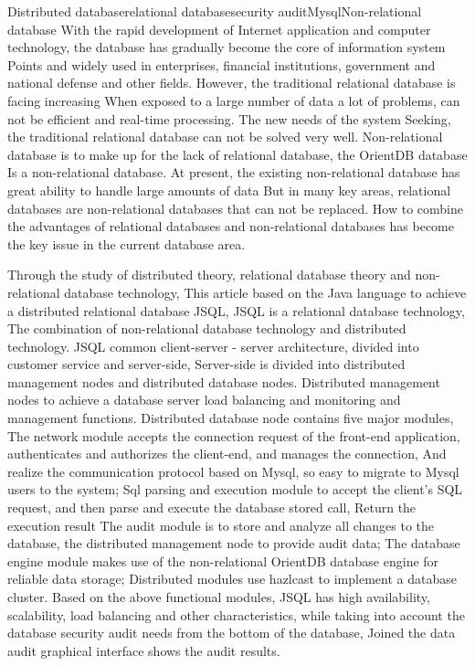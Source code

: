 
\begin{Eabstract}{Distributed database}{relational database}{security audit}{Mysql}{Non-relational database}
With the rapid development of Internet application and computer technology, the database has gradually become the core of information system
Points and widely used in enterprises, financial institutions, government and national defense and other fields.
However, the traditional relational database is facing increasing
When exposed to a large number of data a lot of problems, can not be efficient and real-time processing. The new needs of the system
Seeking, the traditional relational database can not be solved very well.
Non-relational database is to make up for the lack of relational database, the OrientDB database
Is a non-relational database. At present, the existing non-relational database has great ability to handle large amounts of data
But in many key areas, relational databases are non-relational databases that can not be replaced.
How to combine the advantages of relational databases and non-relational databases has become the key issue in the current database area.

Through the study of distributed theory, relational database theory and non-relational database technology,
This article based on the Java language to achieve a distributed relational database JSQL, JSQL is a relational database technology,
The combination of non-relational database technology and distributed technology. JSQL common client-server - server architecture, divided into customer service and server-side,
Server-side is divided into distributed management nodes and distributed database nodes.
Distributed management nodes to achieve a database server load balancing and monitoring and management functions. Distributed database node contains five major modules,
The network module accepts the connection request of the front-end application, authenticates and authorizes the client-end, and manages the connection,
And realize the communication protocol based on Mysql, so easy to migrate to Mysql users to the system;
Sql parsing and execution module to accept the client's SQL request, and then parse and execute the database stored call,
Return the execution result
The audit module is to store and analyze all changes to the database, the distributed management node to provide audit data;
The database engine module makes use of the non-relational OrientDB database engine for reliable data storage;
Distributed modules use hazlcast to implement a database cluster.
Based on the above functional modules, JSQL has high availability, scalability, load balancing and other characteristics, while taking into account the database security audit needs from the bottom of the database,
Joined the data audit graphical interface shows the audit results.


\end{Eabstract}
